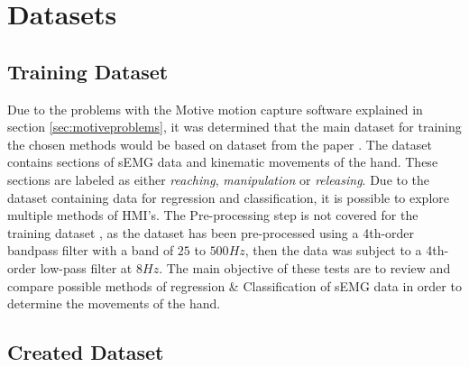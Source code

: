 \documentclass[../main.tex]{subfiles}
\begin{document}




\section{Datasets}
\subsection{Training Dataset}

Due to the problems with the Motive motion capture software explained in section \ref{sec:motiveproblems}, it was determined that the main dataset for training the chosen methods would be based on dataset \cite{kinmusdataset} from the paper \cite{jarque2019}.
The dataset contains sections of sEMG data and kinematic movements of the hand.
These sections are labeled as either \textit{reaching}, \textit{manipulation} or \textit{releasing}.  
Due to the dataset containing data for regression and classification, it is possible to explore multiple methods of HMI's. 
The Pre-processing step is not covered for the training dataset \cite{kinmusdataset}, as the dataset has been pre-processed using a 4th-order bandpass filter with a band of  $25$ to $500Hz$, then the data was subject to a 4th-order low-pass filter at $8 Hz$.
The main objective of these tests are to review and compare possible methods of regression \& Classification of sEMG data in order to determine the movements of the hand.

\subsection{Created Dataset}
\end{document}
